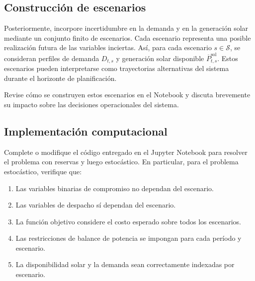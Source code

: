 \documentclass[
	spanish, %
	letterpaper, oneside
]{article}
\begin{document}

\subsection{Construcción de escenarios}

Posteriormente, incorpore incertidumbre en la demanda y en la generación solar mediante un conjunto finito de escenarios. Cada escenario representa una posible realización futura de las variables inciertas. Así, para cada escenario $s \in \mathcal{S}$, se consideran perfiles de demanda $D_{t,s}$ y generación solar disponible $\overline{P}^{\text{sol}}_{t,s}$. Estos escenarios pueden interpretarse como trayectorias alternativas del sistema durante el horizonte de planificación.

Revise cómo se construyen estos escenarios en el Notebook y discuta brevemente su impacto sobre las decisiones operacionales del sistema.


\subsection{Implementación computacional}

Complete o modifique el código entregado en el Jupyter Notebook para resolver el problema con reservas y luego estocástico. En particular, para el problema estocástico, verifique que:

\begin{enumerate}
\item Las variables binarias de compromiso no dependan del escenario.
\item Las variables de despacho sí dependan del escenario.
\item La función objetivo considere el costo esperado sobre todos los escenarios.
\item Las restricciones de balance de potencia se impongan para cada período y escenario.
\item La disponibilidad solar y la demanda sean correctamente indexadas por escenario.
\end{enumerate}
\end{document}
